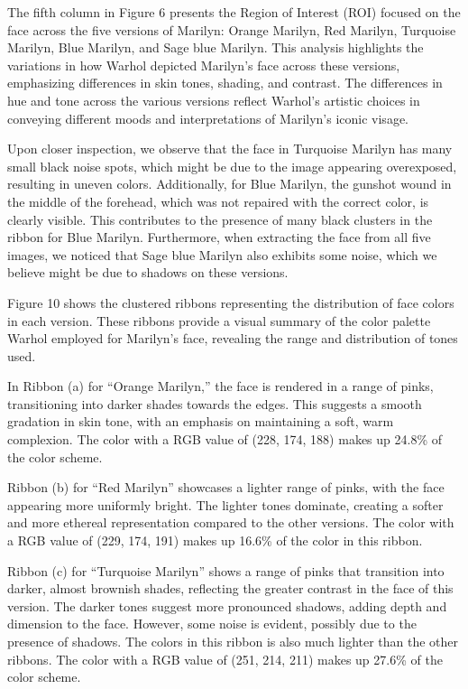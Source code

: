 \documentclass{article}
\begin{document}
The fifth column in Figure 6 presents the Region of Interest (ROI) focused on the face
across the five versions of Marilyn: Orange Marilyn, Red Marilyn,
Turquoise Marilyn, Blue Marilyn, and Sage blue Marilyn. This analysis
highlights the variations in how Warhol depicted Marilyn's face across
these versions, emphasizing differences in skin tones, shading, and
contrast. The differences in hue and tone across the various versions
reflect Warhol's artistic choices in conveying different moods and
interpretations of Marilyn's iconic visage.

Upon closer inspection, we observe that the face in Turquoise
Marilyn has many small black noise spots, which might be due
to the image appearing overexposed, resulting in uneven colors.
Additionally, for Blue Marilyn, the gunshot wound in the middle
of the forehead, which was not repaired with the correct color, is
clearly visible. This contributes to the presence of many black clusters
in the ribbon for Blue Marilyn. Furthermore, when extracting the face
from all five images, we noticed that Sage blue Marilyn also
exhibits some noise, which we believe might be due to
shadows on these versions.

Figure 10 shows the clustered ribbons representing the distribution of
face colors in each version. These ribbons provide a visual summary of
the color palette Warhol employed for Marilyn's face, revealing the
range and distribution of tones used.

In Ribbon (a) for ``Orange Marilyn,'' the face is rendered in a range of
pinks, transitioning into darker shades towards the edges. This suggests
a smooth gradation in skin tone, with an emphasis on maintaining a soft,
warm complexion. The color with a RGB value of (228, 174, 188) makes up 24.8\% of the color scheme. 

Ribbon (b) for ``Red Marilyn'' showcases a lighter range of pinks, with
the face appearing more uniformly bright. The lighter tones dominate,
creating a softer and more ethereal representation compared to the other
versions. The color with a RGB value of (229, 174, 191) makes up 16.6\% of the color in this ribbon. 

Ribbon (c) for ``Turquoise Marilyn'' shows a range of pinks that
transition into darker, almost brownish shades, reflecting the greater
contrast in the face of this version. The darker tones suggest more
pronounced shadows, adding depth and dimension to the face. However,
some noise is evident, possibly due to the presence of shadows. The colors in this ribbon is also much lighter than the other ribbons. The color with a RGB value of (251, 214, 211) makes up 27.6\% of the color scheme. 
\end{document}
